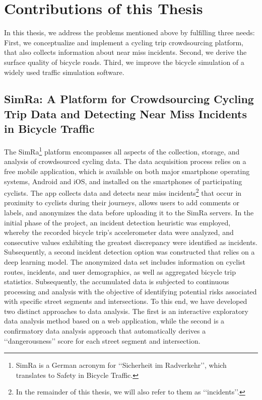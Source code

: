 \section{Contributions of this Thesis}
\label{sec:contributions}
In this thesis, we address the problems mentioned above by fulfilling three needs:
First, we conceptualize and implement a cycling trip crowdsourcing platform, that also collects information about near miss incidents.
Second, we derive the surface quality of bicycle roads.
Third, we improve the bicycle simulation of a widely used traffic simulation software.

\subsection{SimRa: A Platform for Crowdsourcing Cycling Trip Data and Detecting Near Miss Incidents in Bicycle Traffic}
\label{subsec:simra_contribution}
The SimRa\footnote{SimRa is a German acronym for ‘‘Sicherheit im Radverkehr’’, which translates to Safety in Bicycle Traffic.} platform encompasses all aspects of the collection, storage, and analysis of crowdsourced cycling data.
The data acquisition process relies on a free mobile application, which is available on both major smartphone operating systems, Android and iOS, and installed on the smartphones of participating cyclists.
The app collects data and detects near miss incidents\footnote{In the remainder of this thesis, we will also refer to them as ‘‘incidents’’.} that occur in proximity to cyclists during their journeys, allows users to add comments or labels, and anonymizes the data before uploading it to the SimRa servers.
In the initial phase of the project, an incident detection heuristic was employed, whereby the recorded bicycle trip's accelerometer data were analyzed, and consecutive values exhibiting the greatest discrepancy were identified as incidents.
Subsequently, a second incident detection option was constructed that relies on a deep learning model.
The anonymized data set includes information on cyclist routes, incidents, and user demographics, as well as aggregated bicycle trip statistics.
Subsequently, the accumulated data is subjected to continuous processing and analysis with the objective of identifying potential risks associated with specific street segments and intersections.
To this end, we have developed two distinct approaches to data analysis. The first is an interactive exploratory data analysis method based on a web application, while the second is a confirmatory data analysis approach that automatically derives a ‘‘dangerousness’’ score for each street segment and intersection. 

